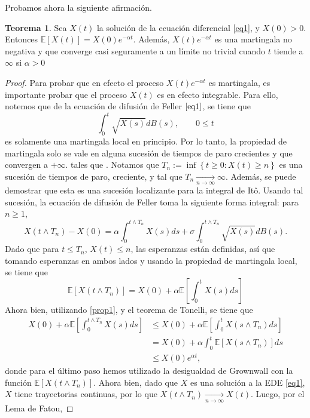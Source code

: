\documentclass[letterpaper]{article}
\renewcommand{\to}{\rightarrow}
\newcommand{\E}{\mathbb{E}}
\newcommand{\1}{\mathds{1}}
\theoremstyle{definition}
\theoremstyle{definition}
\newtheorem{teo}{Teorema}
\theoremstyle{definition}
\theoremstyle{definition}
\theoremstyle{definition}
\begin{document}
 Probamos ahora la siguiente afirmación.
\begin{teo} 
  Sea $X(t)$ la solución de la ecuación diferencial \eqref{eq1}, y $X(0)>0$. Entonces 
  $\E\left[X(t)\right]=X(0)e^{-\alpha t}$. Además, $X(t)e^{-\alpha t}$ es una martingala no negativa y que converge 
  casi seguramente a un límite no trivial cuando $t$ tiende a $\infty$ si $\alpha>0$
  \end{teo}
\begin{proof} 
    Para probar que en efecto el proceso $X(t)e^{-\alpha t}$ es martingala, es importante probar que el proceso $X(t)$ es
    en efecto integrable. Para ello, notemos que de la ecuación de difusión de Feller $\eqref{eq1}$, se 
    tiene que 
    \[
    \int_{0}^{t}\sqrt{X(s)}dB(s), \qquad 0\leq t
    \]
    es solamente una martingala local en principio. Por lo tanto, la propiedad de martingala solo se vale en 
    alguna sucesión de tiempos de paro crecientes y que convergen a $+\infty$. tales que . 
    Notamos que $T_n:=\inf \left\{t\geq0 : X(t)\geq n\right\}$ es una sucesión de tiempos de paro, creciente, 
    y tal que $T_n\xrightarrow[n\to \infty]{}\infty$. Además, se puede demostrar que esta es una sucesión localizante 
    para la integral de Itô. Usando tal sucesión, la ecuación de difusión de 
    Feller toma la siguiente forma integral: para $n\geq1$,
    \[
    X(t\wedge T_n)-X(0)=\alpha\int_0^{t\wedge T_n}X(s)ds+\sigma\int_{0}^{t\wedge T_n}\sqrt{X(s)}dB(s).    
    \]
    Dado que para $t\leq T_n$, $X(t)\leq n$, las esperanzas están definidas, así que 
    tomando esperanzas en ambos lados y usando la propiedad de martingala local, se tiene que 
    \[
    \E\left[X(t\wedge T_n)\right]=X(0)+\alpha \E\left[\int_{0}^{t}X(s)ds\right]    
    \]
    Ahora bien, utilizando \ref{prop1}, y el teorema de Tonelli, se tiene que 
    \begin{align*}
        X(0)+\alpha \E\left[\int_{0}^{t\wedge T_n}X(s)ds\right]&\leq X(0)+\alpha \E\left[\int_{0}^{t}X(s\wedge T_n)ds\right]\\
        &=X(0)+\alpha \int_{0}^{t} \E\left[ X(s \wedge T_n) \right] ds\\
        &\leq X(0)e^{\alpha t},
\end{align*} 
    donde para el último paso hemos utilizado la desigualdad de Grownwall con la función $\E\left[X(t\wedge T_n)\right]$.
    Ahora bien, dado que $X$ es una solución a la EDE \eqref{eq1}, $X$ tiene trayectorias continuas, por lo que 
    $X(t\wedge T_n)\xrightarrow[n\to\infty]{}X(t)$. Luego, por el Lema de Fatou,


\end{proof}
\end{document}
